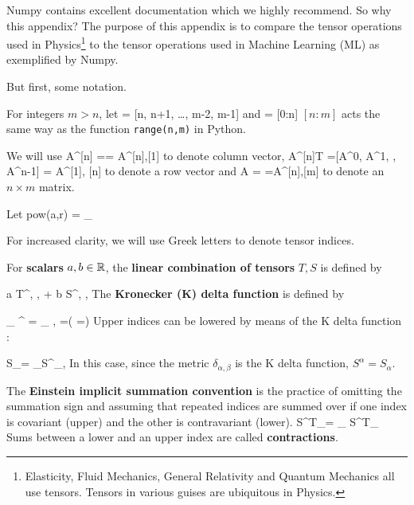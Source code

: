 Numpy contains
excellent documentation
which we highly recommend.
So why this appendix?
The purpose of this appendix is
to compare the tensor
operations
used in Physics\footnote{Elasticity, Fluid Mechanics, General Relativity and Quantum Mechanics all use tensors. Tensors in various guises are ubiquitous in Physics.}
to the tensor operations
used in Machine Learning (ML) as exemplified by Numpy.

 But first, some notation.

For integers $m> n$, let
\beq
[n:m] = [n, n+1, \ldots, m-2, m-1]
\eeq
and
\beq
[n] = [0:n]
\eeq
$[n:m]$ acts the
same way as
the function {\tt range(n,m)} in Python.

We will use
\beq
A^{[n]} = =
A^{[n],[1]}
\eeq
to denote column vector,
\beq
A^{[n]T} =[A^0, A^1, \cdots, A^{n-1}] =
A^{[1], [n]}
\eeq
to denote a row vector
and
\beq
A = =A^{[n],[m]}
\eeq
to denote an $n\times m$ matrix.

Let
\beq
pow(a,r) = \underbrace{[a, a, \ldots, a]}_{}
\eeq

For increased clarity,
we will use Greek
letters to denote tensor indices.


For {\bf scalars} $a,b\in{ \mathbb{R}}$, the {\bf linear combination of tensors} $T, S$ is defined by



\rarrow a T^{\alpha, \beta, \gamma} + b S^{\alpha, \beta, \gamma}
\eeq
The {\bf Kronecker (K) delta function} is defined by

\beq
\delta_{
\alpha}^{\beta} = \delta_{
\alpha, \beta} =\indi(
\alpha=\beta)
\eeq
Upper indices can be lowered by means of the K delta function :

\beq
S_\beta = \sum_\alpha S^\alpha \delta_{\alpha,\beta}
\eeq
In this case, since the metric $\delta_{\alpha, \beta}$ is the K delta function, $S^{\alpha} =S_\alpha$.

The {\bf Einstein implicit summation convention} is the
practice of omitting the summation sign and assuming  that repeated indices are summed over if
one index is covariant (upper)
and the other is contravariant (lower).
\beq
S^\alpha T_\alpha = \sum_\alpha
S^\alpha T_\alpha
\eeq
Sums between a lower and an upper index are called {\bf contractions}.

